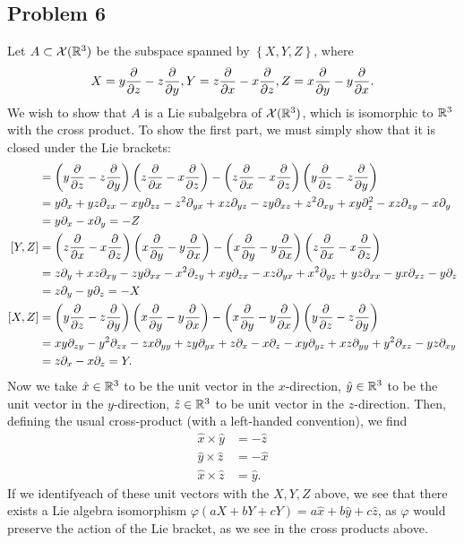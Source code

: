 \documentclass{../../mathnotes}
\begin{document}
\subsection*{Problem 6}

Let $A\subset\mathcal{X}(\mathbb{R}^3)$ be the subspace spanned by $\left\{ X,Y,Z \right\}$, where
\begin{align*}
    X=y\frac{\partial}{\partial z}-z\frac{\partial}{\partial y}, Y=z\frac{\partial}{\partial x}-x\frac{\partial}{\partial z}, Z=x\frac{\partial}{\partial y}-y\frac{\partial}{\partial x}.
\end{align*}
We wish to show that $A$ is a Lie subalgebra of $\mathcal{X}(\mathbb{R}^3)$, which is isomorphic to $\mathbb{R}^3$ with the
cross product. To show the first part, we must simply show that it is closed under the Lie brackets:
\begin{align*}
    [X,Y]&=\left( y\frac{\p}{\p z}-z\frac{\p}{\p y} \right)\left( z\frac{\p}{\p x}-x\frac{\p}{\p z} \right)
    -\left( z\frac{\p}{\p x}-x\frac{\p}{\p z} \right)\left( y\frac{\p}{\p z}-z\frac{\p}{\p y} \right)\\
    &=y\p_x+yz\p_{zx}-xy\p_{zz}-z^2\p_{yx}+xz\p_{yz}
    -zy\p_{xz}+z^2\p_{xy}+xy\p_z^2-xz\p_{zy}-x\p_y\\
    &=y\p_x-x\p_y=-Z\\
    [Y,Z]&=\left( z\frac{\p}{\p x}-x\frac{\p}{\p z} \right)\left( x\frac{\p}{\p y}-y\frac{\p}{\p x} \right)
    -\left( x\frac{\p}{\p y}-y\frac{\p}{\p x} \right)\left( z\frac{\p}{\p x}-x\frac{\p}{\p z} \right)\\
    &=z\p_y+xz\p_{xy}-zy\p_{xx}-x^2\p_{zy}+xy\p_{zx}-xz\p_{yx}+x^2\p_{yz}+yz\p_{xx}-yx\p_{xz}-y\p_z\\
    &=z\p_y-y\p_z=-X\\
    [X,Z]&=\left( y\frac{\p}{\p z}-z\frac{\p}{\p y} \right)\left( x\frac{\p}{\p y}-y\frac{\p}{\p x} \right)
    -\left( x\frac{\p}{\p y}-y\frac{\p}{\p x} \right)\left( y\frac{\p}{\p z}-z\frac{\p}{\p y} \right)\\
    &=xy\p_{zy}-y^2\p_{zx}-zx\p_{yy}+zy\p_{yx}+z\p_x-x\p_z-xy\p_{yz}+xz\p_{yy}+y^2\p_{xz}-yz\p_{xy}\\
    &=z\p_x-x\p_z=Y.
\end{align*}
Now we take $\hat x\in\mathbb{R}^3$ to be the unit vector in the $x$-direction, $\hat y\in\mathbb{R}^3$ to be the unit
vector in the $y$-direction, $\hat z\in\mathbb{R}^3$ to be unit vector in the $z$-direction. Then, defining the usual
cross-product (with a left-handed convention), we find 
\begin{align*}
    \hat x \times \hat y &= -\hat z\\
    \hat y \times \hat z &= -\hat x\\
    \hat x \times \hat z &= \hat y.
\end{align*}
If we identifyeach of these unit vectors with the $X,Y,Z$ above, we see that there exists a Lie algebra
isomorphism $\varphi(aX+bY+cY)=a\hat x+b\hat y+c\hat z$, as $\varphi$ would preserve the action of the Lie bracket,
as we see in the cross products above.
\end{document}

